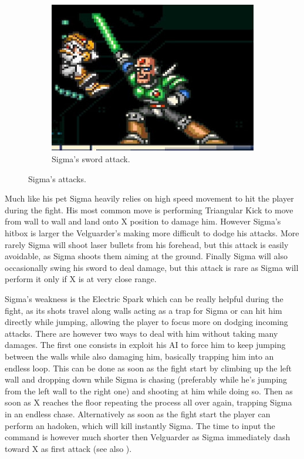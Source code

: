 \begin{figure}[htp]
\begin{subfigure}[t]{0.4\linewidth}
		\includegraphics[width=\linewidth]{figures/X1/Sigma_stages/Sigma_sword.jpg}
		\caption{Sigma's sword attack.}
	\end{subfigure}
	\caption{Sigma's attacks.}
\end{figure}

Much like his pet Sigma heavily relies on high speed movement to hit the player during the fight. His most common move is performing Triangular Kick to move from wall to wall and land onto X position to damage him. However Sigma's hitbox is larger the Velguarder's making more difficult to dodge his attacks. More rarely Sigma will shoot laser bullets from his forehead, but this attack is easily avoidable, as Sigma shoots them aiming at the ground. Finally Sigma will also occasionally swing his sword to deal damage, but this attack is rare as Sigma will perform it only if X is at very close range.

Sigma's weakness is the Electric Spark which can be really helpful during the fight, as its shots travel along walls acting as a trap for Sigma or can hit him directly while jumping, allowing the player to focus more on dodging incoming attacks. There are however two ways to deal with him  without taking many damages. The first one consists in exploit his AI to force him to keep jumping between the walls while also damaging him, basically trapping him into an endless loop. This can be done as soon as the fight start by climbing up the left wall and dropping down while Sigma is chasing (preferably while he's jumping from the left wall to the right one) and shooting at him while doing so. Then as soon as X reaches the floor repeating the process all over again, trapping Sigma in an endless chase. Alternatively as soon as the fight start the player can perform an hadoken, which will kill instantly Sigma. The time to input the command is however much shorter then Velguarder as Sigma immediately dash toward X as first attack (see also ).

